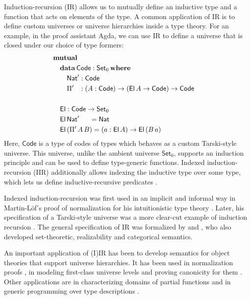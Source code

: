 \documentclass[acmsmall,screen,review]{acmart}
\newcommand{\msf}[1]{{\mathsf{#1}}}
\newcommand{\mbf}[1]{{\mathbf{#1}}}
\newcommand{\data}{\mbf{data}}
\newcommand{\Set}{\msf{Set}}
\newcommand{\where}{\mbf{where}}
\newcommand{\Nat}{\msf{Nat}}
\newcommand{\El}{\msf{El}}
\newcommand{\Code}{\msf{Code}}
\begin{document}
Induction-recursion (IR) allows us to mutually define an inductive type and a function that acts on
elements of the type. A common application of IR is to define custom universes or universe
hierarchies inside a type theory. For an example, in the proof assistant Agda, we can use IR to
define a universe that is closed under our choice of type formers:
\begin{alignat*}{3}
  & \mbf{mutual} \\
  & \quad\data\,\Code : \Set_0\,\where \\
  & \quad\quad \Nat' : \Code\\
  & \quad\quad \Pi' \hspace{0.8em} : (A : \Code) \to (\El\,A \to \Code) \to \Code
  & \\
  & \\
  & \quad\El : \Code \to \Set_0 \\
  & \quad\El\,\Nat'\hspace{1.5em}  = \Nat \\
  & \quad\El\,(\Pi'\,A\,B) = (a : \El\,A) \to \El\,(B\,a)
\end{alignat*}
Here, $\Code$ is a type of codes of types which behaves as a custom Tarski-style universe. This
universe, unlike the ambient universe $\Set_0$, supports an induction principle and can be used to
define type-generic functions. Indexed induction-recursion (IIR) additionally allows indexing the
inductive type over some type, which lets us define inductive-recursive predicates
\cite{DBLP:journals/jlp/DybjerS06}.

Indexed induction-recursion was first used in an implicit and informal way in Martin-Löf's proof of
normalization for his intuitionistic type theory \cite{martin1975intuitionistic}. Later, his
specification of a Tarski-style universe was a more clear-cut example of induction recursion
\cite{martinlof84sambin}. The general specification of IR was formalized by
\citet{DBLP:journals/jsyml/Dybjer00} and
\citet{dybjer99finite,DBLP:journals/jlp/DybjerS06,DBLP:journals/apal/DybjerS03}, who also developed
set-theoretic, realizability and categorical semantics.

An important application of (I)IR has been to develop semantics for object theories that support
universe hierarchies. It has been used in normalization proofs
\cite{DBLP:journals/pacmpl/0001OV18,DBLP:journals/pacmpl/PujetT23,DBLP:journals/pacmpl/AbelDE23}, in
modeling first-class universe levels \cite{first-class-univ} and proving canonicity for them
\cite{DBLP:journals/corr/abs-2502-20485}. Other applications are in characterizing domains of
partial functions \cite{DBLP:conf/tphol/BoveC01} and in generic programming over type descriptions
\cite{DBLP:journals/njc/BenkeDJ03,diehl2017fully}.
\end{document}
